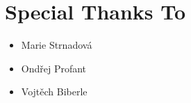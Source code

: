 
\chapter*{Special Thanks To}

\begin{itemize}
  \item[] Marie Strnadová
  \item[] Ondřej Profant
  \item[] Vojtěch Biberle
\end{itemize}

